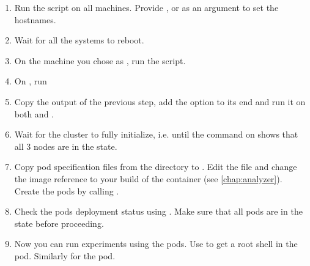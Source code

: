 \begin{enumerate}
    \item Run the  script on all machines. Provide ,  or  as an argument to set the hostnames.

    \item Wait for all the systems to reboot.

    \item On the machine you chose as , run the  script.

    \item On , run 

    \item Copy the output of the previous step, add the  option to its end and run it on both  and .

    \item Wait for the cluster to fully initialize, i.e. until the command  on  shows that all 3 nodes are in the  state.

    \item Copy pod specification files from the  directory to . Edit the  file and change the image reference to your build of the  container (see \cref{chap:analyzer}). Create the pods by calling .

    \item Check the pods deployment status using . Make sure that all pods are in the  state before proceeding.

    \item Now you can run experiments using the pods. Use  to get a root shell in the  pod. Similarly for the  pod.
\end{enumerate}